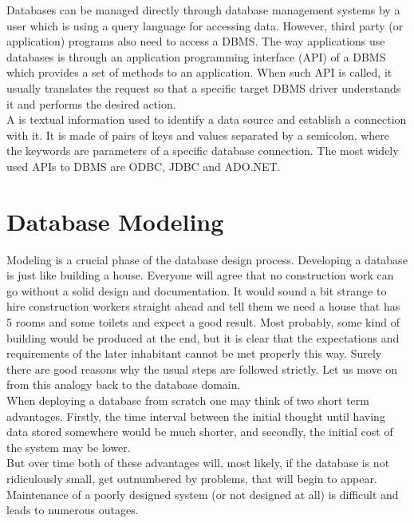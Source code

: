 Databases can be managed directly through database management systems by a user which is using a query language for accessing data. 
However, third party (or application) programs also need to access a DBMS. 
The way applications use databases is through an application programming interface (API) of a DBMS which provides a set of methods to an application.
When such API is called, it usually translates the request so that a specific target DBMS driver understands it and performs the desired action. \\

\label{connection_string}
A  is textual information used to identify a data source and establish a connection with it. It is made of pairs of keys and values separated by a semicolon, where the keywords are parameters of a specific database connection. The most widely used APIs to DBMS are ODBC, JDBC and ADO.NET.

\section{Database Modeling}
\label{chap:database_modeling}

Modeling is a crucial phase of the database design process.
Developing a database is just like building a house. 
Everyone will agree that no construction work can go without a solid design and documentation. 
It would sound a bit strange to hire construction workers straight ahead and tell them we need a house that has 5 rooms and some toilets and expect a good result. Most probably, some kind of building would be produced at the end, but it is clear that the expectations and requirements of the later inhabitant cannot be met properly this way.
Surely there are good reasons why the usual steps are followed strictly.
Let us move on from this analogy back to the database domain. \\
When deploying a database from scratch one may think of two short term advantages. Firstly,  the time interval between the initial thought until having data stored somewhere would be much shorter, and secondly, the initial cost of the system may be lower. \\
But over time both of these advantages will, most likely, if the database is not ridiculously small, get outnumbered by problems, that will begin to appear. Maintenance of a poorly designed system (or not designed at all) is difficult and leads to numerous outages.\\

